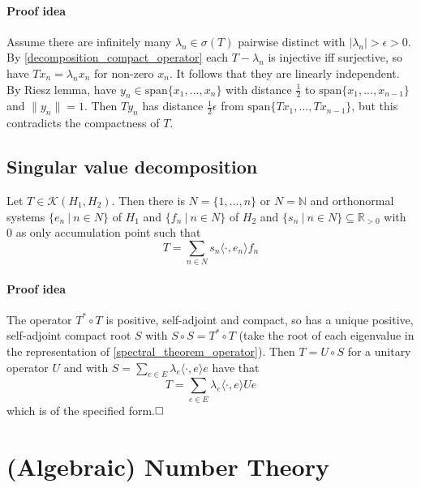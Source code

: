 \documentclass{scrartcl}
\newcommand{\R}{\mathbb{R}}
\newcommand{\N}{\mathbb{N}}
\begin{document}
\paragraph{Proof idea} Assume there are infinitely many $\lambda_n \in \sigma(T)$ pairwise distinct with $|\lambda_n| > \epsilon > 0$. By \ref{decomposition_compact_operator} each $T - \lambda_n$ is injective iff surjective, so have $Tx_n = \lambda_n x_n$ for non-zero $x_n$. 
It follows that they are linearly independent. By Riesz lemma, have $y_n \in \mathrm{span}\{x_1, ..., x_n\}$ with distance $\frac 1 2$ to $\mathrm{span}\{x_1, ..., x_{n - 1}\}$ and $\| y_n \| = 1$. Then $Ty_n$ has distance $\frac 1 2 \epsilon$ from $\mathrm{span}\{Tx_1, ..., Tx_{n-1}\}$, but this contradicts the compactness of $T$.

\subsection{Singular value decomposition}
Let $T \in \mathcal{K}(H_1, H_2)$. Then there is $N = \{ 1, ..., n \}$ or $N = \N$ and orthonormal systems $\{ e_n \ | \ n \in N \}$ of $H_1$ and $\{ f_n \ | \ n \in N \}$ of $H_2$ and $\{ s_n \ | \ n \in N \} \subseteq \R_{>0}$ with $0$ as only accumulation point such that
\begin{equation*}
    T = \sum_{n \in N} s_n \langle \cdot, e_n \rangle f_n
\end{equation*}
\paragraph{Proof idea} 
The operator $T^* \circ T$ is positive, self-adjoint and compact, so has a unique positive, self-adjoint compact root $S$ with $S \circ S = T^* \circ T$ (take the root of each eigenvalue in the representation of \ref{spectral_theorem_operator}).
Then $T = U \circ S$ for a unitary operator $U$ and with $S = \sum_{e \in E} \lambda_e \langle \cdot, e \rangle e$ have that
\begin{equation*}
    T = \sum_{e \in E} \lambda_e \langle \cdot, e \rangle Ue
\end{equation*}
which is of the specified form.$\hfill\square$

\section{(Algebraic) Number Theory}
\end{document}
